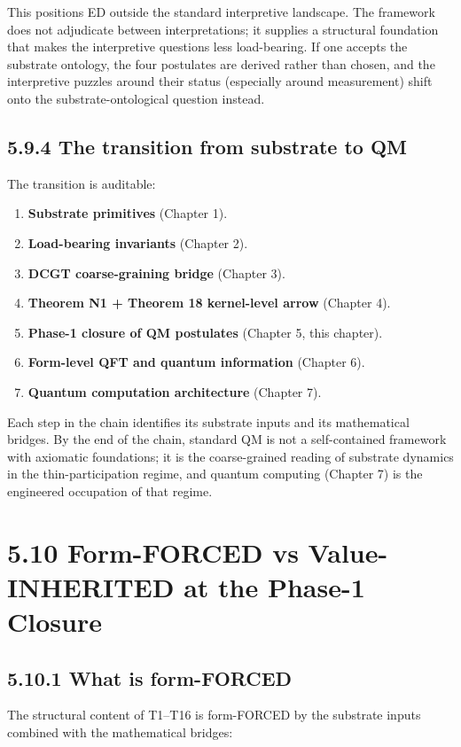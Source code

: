 \documentclass[11pt]{book}
\begin{document}
This positions ED outside the standard interpretive landscape. The framework does not adjudicate between interpretations; it supplies a structural foundation that makes the interpretive questions less load-bearing. If one accepts the substrate ontology, the four postulates are derived rather than chosen, and the interpretive puzzles around their status (especially around measurement) shift onto the substrate-ontological question instead.

\subsection{5.9.4 The transition from substrate to QM}

The transition is auditable:

\begin{enumerate}
\item \textbf{Substrate primitives} (Chapter 1).
\item \textbf{Load-bearing invariants} (Chapter 2).
\item \textbf{DCGT coarse-graining bridge} (Chapter 3).
\item \textbf{Theorem N1 + Theorem 18 kernel-level arrow} (Chapter 4).
\item \textbf{Phase-1 closure of QM postulates} (Chapter 5, this chapter).
\item \textbf{Form-level QFT and quantum information} (Chapter 6).
\item \textbf{Quantum computation architecture} (Chapter 7).
\end{enumerate}

Each step in the chain identifies its substrate inputs and its mathematical bridges. By the end of the chain, standard QM is not a self-contained framework with axiomatic foundations; it is the coarse-grained reading of substrate dynamics in the thin-participation regime, and quantum computing (Chapter 7) is the engineered occupation of that regime.

\section{5.10 Form-FORCED vs Value-INHERITED at the Phase-1 Closure}

\subsection{5.10.1 What is form-FORCED}

The structural content of T1–T16 is form-FORCED by the substrate inputs combined with the mathematical bridges:
\end{document}
